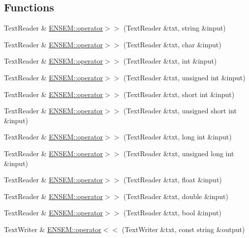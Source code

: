 \subsection*{Functions}
\begin{DoxyCompactItemize}
\item 
Text\+Reader \& \mbox{\hyperlink{namespaceENSEM_a5e17fc4d7658f9f5cd52fa26a57c2063}{E\+N\+S\+E\+M\+::operator$>$$>$}} (Text\+Reader \&txt, string \&input)
\item 
Text\+Reader \& \mbox{\hyperlink{group__io_ga4eecbfcd47e20672ad52ed41560f8573}{E\+N\+S\+E\+M\+::operator$>$$>$}} (Text\+Reader \&txt, char \&input)
\item 
Text\+Reader \& \mbox{\hyperlink{group__io_gab07a2169d63109c0bd1ec46e750bed16}{E\+N\+S\+E\+M\+::operator$>$$>$}} (Text\+Reader \&txt, int \&input)
\item 
Text\+Reader \& \mbox{\hyperlink{group__io_gac2f3c9587dbdd787bd2dfe5023813c67}{E\+N\+S\+E\+M\+::operator$>$$>$}} (Text\+Reader \&txt, unsigned int \&input)
\item 
Text\+Reader \& \mbox{\hyperlink{group__io_gad9337602901bc89db928ac4dc262e96f}{E\+N\+S\+E\+M\+::operator$>$$>$}} (Text\+Reader \&txt, short int \&input)
\item 
Text\+Reader \& \mbox{\hyperlink{group__io_ga371e4c7d2636c108da9fd5217e1532ce}{E\+N\+S\+E\+M\+::operator$>$$>$}} (Text\+Reader \&txt, unsigned short int \&input)
\item 
Text\+Reader \& \mbox{\hyperlink{group__io_ga7f8e9c81ef087d66a47d71decfc6456f}{E\+N\+S\+E\+M\+::operator$>$$>$}} (Text\+Reader \&txt, long int \&input)
\item 
Text\+Reader \& \mbox{\hyperlink{group__io_gadafd202db51d66c8ce03edc7a6cd1e0f}{E\+N\+S\+E\+M\+::operator$>$$>$}} (Text\+Reader \&txt, unsigned long int \&input)
\item 
Text\+Reader \& \mbox{\hyperlink{group__io_gadcd1421418b0255e88751789c70e23e4}{E\+N\+S\+E\+M\+::operator$>$$>$}} (Text\+Reader \&txt, float \&input)
\item 
Text\+Reader \& \mbox{\hyperlink{group__io_gaae0d5e305c1af4b3085b3a4f3b15f4e9}{E\+N\+S\+E\+M\+::operator$>$$>$}} (Text\+Reader \&txt, double \&input)
\item 
Text\+Reader \& \mbox{\hyperlink{group__io_ga807a1dae246fb10630e4e967d01b2e85}{E\+N\+S\+E\+M\+::operator$>$$>$}} (Text\+Reader \&txt, bool \&input)
\item 
Text\+Writer \& \mbox{\hyperlink{namespaceENSEM_a6171ccb35b078b8ee9d5949ac2903375}{E\+N\+S\+E\+M\+::operator$<$$<$}} (Text\+Writer \&txt, const string \&output)

\end{DoxyCompactItemize}

